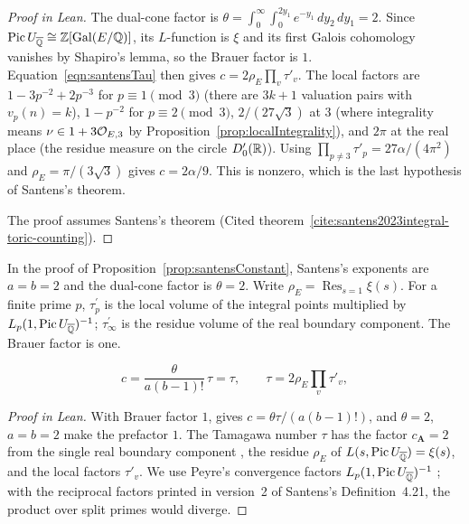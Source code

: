 \begin{proof}[Proof in Lean]
The dual-cone factor is $\theta=\int_0^\infty\int_0^{2y_1}e^{-y_1}\,dy_2\,dy_1=2$. Since $\operatorname{Pic}U_{\overline{\mathbb{Q}}}\cong\mathbb{Z}[\operatorname{Gal}(E/\mathbb{Q})]$, its $L$-function is $\xi$ and its first Galois cohomology vanishes by Shapiro's lemma, so the Brauer factor is $1$. Equation~\ref{eqn:santensTau} then gives $c=2\rho_E\prod_v\tau'_v$. The local factors are $1-3p^{-2}+2p^{-3}$ for $p\equiv1\pmod 3$ (there are $3k+1$ valuation pairs with $v_p(n)=k$), $1-p^{-2}$ for $p\equiv2\pmod3$, $2/(27\sqrt3)$ at $3$ (where integrality means $\nu\in1+3\mathcal{O}_{E,3}$ by Proposition~\ref{prop:localIntegrality}), and $2\pi$ at the real place (the residue measure on the circle $D_0'(\mathbb{R})$). Using $\prod_{p\neq3}\tau'_p=27\alpha/(4\pi^2)$ and $\rho_E=\pi/(3\sqrt3)$ gives $c=2\alpha/9$. This is nonzero, which is the last hypothesis of Santens's theorem.

The proof assumes Santens's theorem (Cited theorem~\ref{cite:santens2023integral-toric-counting}).

\end{proof}

\begin{equationnode}

\label{eqn:santensTau}


\leanok

In the proof of Proposition~\ref{prop:santensConstant}, Santens's exponents are $a=b=2$ and the dual-cone factor is $\theta=2$. Write $\rho_E=\operatorname{Res}_{s=1}\xi(s)$. For a finite prime $p$, $\tau_p^\prime$ is the local volume of the integral points multiplied by $L_p(1,\operatorname{Pic}U_{\overline{\mathbb{Q}}})^{-1}$; $\tau_\infty^\prime$ is the residue volume of the real boundary component. The Brauer factor is one.

\begin{equation*} c=\frac{\theta}{a(b-1)!}\,\tau=\tau,\qquad \tau=2\rho_E\prod_v\tau'_v, \end{equation*}

\end{equationnode}

\begin{proof}[Proof in Lean]

\leanok


With Brauer factor $1$, \cite[Theorem~6.9, Lemma~5.24]{santens2023integral} gives $c=\theta\tau/(a(b-1)!)$, and $\theta=2$, $a=b=2$ make the prefactor $1$. The Tamagawa number $\tau$ has the factor $c_{\mathbf A}=2$ from the single real boundary component \cite[Definition~4.21]{santens2023integral}, the residue $\rho_E$ of $L(s,\operatorname{Pic}U_{\overline{\mathbb{Q}}})=\xi(s)$, and the local factors $\tau'_v$. We use Peyre's convergence factors $L_p(1,\operatorname{Pic}U_{\overline{\mathbb{Q}}})^{-1}$ \cite[\S2]{peyre1995hauteurs}; with the reciprocal factors printed in version~2 of Santens's Definition~4.21, the product over split primes would diverge.

\end{proof}

